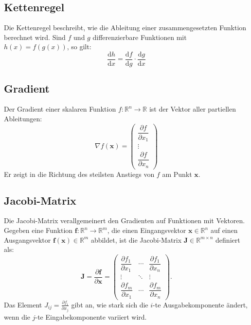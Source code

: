 \subsection{Kettenregel}

Die Kettenregel beschreibt, wie die Ableitung einer zusammengesetzten Funktion berechnet wird.
Sind $f$ und $g$ differenzierbare Funktionen mit $h(x) = f(g(x))$, so gilt:
\begin{equation}
    \frac{\mathrm{d}h}{\mathrm{d}x} = \frac{\mathrm{d}f}{\mathrm{d}g} \cdot \frac{\mathrm{d}g}{\mathrm{d}x}
\end{equation}

\subsection{Gradient}

Der Gradient einer skalaren Funktion $f : \mathbb{R}^n \to \mathbb{R}$ ist der Vektor aller
partiellen Ableitungen:
\begin{equation}
    \nabla f(\mathbf{x}) =
    \begin{pmatrix}
        \dfrac{\partial f}{\partial x_1} \\[6pt]
        \vdots \\[2pt]
        \dfrac{\partial f}{\partial x_n}
    \end{pmatrix}
\end{equation}
Er zeigt in die Richtung des steilsten Anstiegs von $f$ am Punkt $\mathbf{x}$.

\subsection{Jacobi-Matrix}

Die Jacobi-Matrix verallgemeinert den Gradienten auf Funktionen mit Vektoren.
Gegeben eine Funktion $\mathbf{f} : \mathbb{R}^n \to \mathbb{R}^m$, die einen Eingangsvektor
$\mathbf{x} \in \mathbb{R}^n$ auf einen Ausgangsvektor $\mathbf{f}(\mathbf{x}) \in \mathbb{R}^m$ abbildet,
ist die Jacobi-Matrix $\mathbf{J} \in \mathbb{R}^{m \times n}$ definiert als:
\begin{equation}
    \mathbf{J} = \frac{\partial \mathbf{f}}{\partial \mathbf{x}} =
    \begin{pmatrix}
        \dfrac{\partial f_1}{\partial x_1} & \cdots & \dfrac{\partial f_1}{\partial x_n} \\[8pt]
        \vdots & \ddots & \vdots \\[4pt]
        \dfrac{\partial f_m}{\partial x_1} & \cdots & \dfrac{\partial f_m}{\partial x_n}
    \end{pmatrix}.
\end{equation}
Das Element $J_{ij} = \frac{\partial f_i}{\partial x_j}$ gibt an, wie stark sich die $i$-te
Ausgabekomponente ändert, wenn die $j$-te Eingabekomponente variiert wird.

